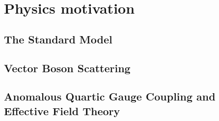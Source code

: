 \chapter{Physics motivation}
\section{The Standard Model}

\section{Vector Boson Scattering}
\section{Anomalous Quartic Gauge Coupling and Effective Field Theory}


